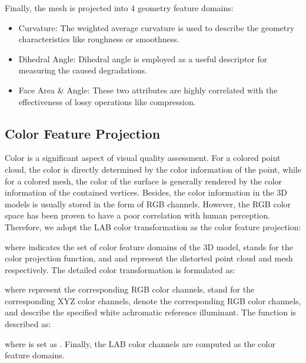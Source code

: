 \documentclass[lettersize,journal]{IEEEtran}
\begin{document}
Finally, the mesh is projected into 4 geometry feature domains:
\begin{itemize}
    \item Curvature: The weighted average curvature is used to describe the geometry characteristics like roughness or smoothness.
    \item Dihedral Angle: Dihedral angle is employed as a useful descriptor for measuring the caused degradations.
    \item Face Area \& Angle: These two attributes are highly correlated with the effectiveness of lossy operations like compression.
\end{itemize}







\subsection{Color Feature Projection}
\label{pc:color}
Color is a significant aspect of visual quality assessment. For a colored point cloud, the color is directly determined by the color information of the point, while for a colored mesh, the color of the surface is generally rendered by the color information of the contained vertices. Besides, the color information in the 3D models is usually stored in the form of RGB channels. However, the RGB color space has been proven to have a poor correlation with human perception.
Therefore, we adopt the LAB color transformation as the color feature projection:

where  indicates the set of color feature domains of the 3D model,  stands for the color projection function, and  and  represent the distorted point cloud and mesh respectively. The detailed color transformation is formulated as:


where  represent the corresponding RGB color channels,  stand for the corresponding XYZ color channels,  denote the corresponding RGB color channels, and  describe the specified white achromatic reference illuminant. The  function is described as:

where  is set as . Finally, the LAB color channels are computed as the color feature domains.
\end{document}

